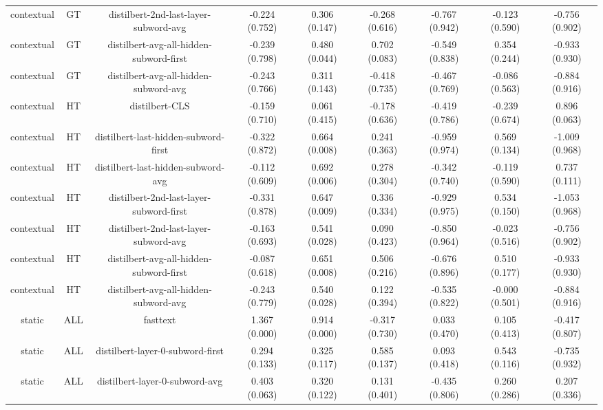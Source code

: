 \begin{sidewaystable}[htb]
\begin{tabular}{@{}ccccccccc@{}}
        contextual & GT & distilbert-2nd-last-layer-subword-avg & -0.224 (0.752) & 0.306 (0.147) & -0.268 (0.616) & -0.767 (0.942) & -0.123 (0.590) & -0.756 (0.902) \\
        contextual & GT & distilbert-avg-all-hidden-subword-first & -0.239 (0.798) & 0.480 (0.044) & 0.702 (0.083) & -0.549 (0.838) & 0.354 (0.244) & -0.933 (0.930) \\
        contextual & GT & distilbert-avg-all-hidden-subword-avg & -0.243 (0.766) & 0.311 (0.143) & -0.418 (0.735) & -0.467 (0.769) & -0.086 (0.563) & -0.884 (0.916) \\
        contextual & HT & distilbert-CLS & -0.159 (0.710) & 0.061 (0.415) & -0.178 (0.636) & -0.419 (0.786) & -0.239 (0.674) & 0.896 (0.063) \\
        contextual & HT & distilbert-last-hidden-subword-first & -0.322 (0.872) & 0.664 (0.008) & 0.241 (0.363) & -0.959 (0.974) & 0.569 (0.134) & -1.009 (0.968) \\
        contextual & HT & distilbert-last-hidden-subword-avg & -0.112 (0.609) & 0.692 (0.006) & 0.278 (0.304) & -0.342 (0.740) & -0.119 (0.590) & 0.737 (0.111) \\
        contextual & HT & distilbert-2nd-last-layer-subword-first & -0.331 (0.878) & 0.647 (0.009) & 0.336 (0.334) & -0.929 (0.975) & 0.534 (0.150) & -1.053 (0.968) \\
        contextual & HT & distilbert-2nd-last-layer-subword-avg & -0.163 (0.693) & 0.541 (0.028) & 0.090 (0.423) & -0.850 (0.964) & -0.023 (0.516) & -0.756 (0.902) \\
        contextual & HT & distilbert-avg-all-hidden-subword-first & -0.087 (0.618) & 0.651 (0.008) & 0.506 (0.216) & -0.676 (0.896) & 0.510 (0.177) & -0.933 (0.930) \\
        contextual & HT & distilbert-avg-all-hidden-subword-avg & -0.243 (0.779) & 0.540 (0.028) & 0.122 (0.394) & -0.535 (0.822) & -0.000 (0.501) & -0.884 (0.916) \\
        static & ALL & fasttext & 1.367 (0.000) & 0.914 (0.000) & -0.317 (0.730) & 0.033 (0.470) & 0.105 (0.413) & -0.417 (0.807) \\
        static & ALL & distilbert-layer-0-subword-first & 0.294 (0.133) & 0.325 (0.117) & 0.585 (0.137) & 0.093 (0.418) & 0.543 (0.116) & -0.735 (0.932) \\
        static & ALL & distilbert-layer-0-subword-avg & 0.403 (0.063) & 0.320 (0.122) & 0.131 (0.401) & -0.435 (0.806) & 0.260 (0.286) & 0.207 (0.336) \\

\end{tabular}
\end{sidewaystable}
